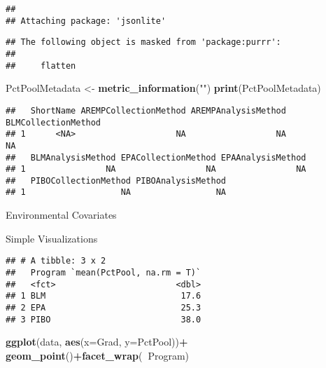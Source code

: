 \documentclass[]{article}
\newenvironment{Shaded}{\begin{snugshade}}{\end{snugshade}}
\newcommand{\DataTypeTok}[1]{\textcolor[rgb]{0.13,0.29,0.53}{#1}}
\newcommand{\KeywordTok}[1]{\textcolor[rgb]{0.13,0.29,0.53}{\textbf{#1}}}
\newcommand{\NormalTok}[1]{#1}
\newcommand{\OperatorTok}[1]{\textcolor[rgb]{0.81,0.36,0.00}{\textbf{#1}}}
\newcommand{\StringTok}[1]{\textcolor[rgb]{0.31,0.60,0.02}{#1}}
\begin{document}
\begin{verbatim}
## 
## Attaching package: 'jsonlite'
\end{verbatim}

\begin{verbatim}
## The following object is masked from 'package:purrr':
## 
##     flatten
\end{verbatim}

\begin{Shaded}
\begin{Highlighting}[]
\NormalTok{PctPoolMetadata <-}\StringTok{ }\KeywordTok{metric_information}\NormalTok{(}\StringTok{""}\NormalTok{)}
\KeywordTok{print}\NormalTok{(PctPoolMetadata)}
\end{Highlighting}
\end{Shaded}

\begin{verbatim}
##   ShortName AREMPCollectionMethod AREMPAnalysisMethod BLMCollectionMethod
## 1      <NA>                    NA                  NA                  NA
##   BLMAnalysisMethod EPACollectionMethod EPAAnalysisMethod
## 1                NA                  NA                NA
##   PIBOCollectionMethod PIBOAnalysisMethod
## 1                   NA                 NA
\end{verbatim}

Environmental Covariates

Simple Visualizations

\begin{Shaded}
\end{Shaded}

\begin{verbatim}
## # A tibble: 3 x 2
##   Program `mean(PctPool, na.rm = T)`
##   <fct>                        <dbl>
## 1 BLM                           17.6
## 2 EPA                           25.3
## 3 PIBO                          38.0
\end{verbatim}

\begin{Shaded}
\begin{Highlighting}[]
\KeywordTok{ggplot}\NormalTok{(data, }\KeywordTok{aes}\NormalTok{(}\DataTypeTok{x=}\NormalTok{Grad, }\DataTypeTok{y=}\NormalTok{PctPool))}\OperatorTok{+}\StringTok{ }\KeywordTok{geom_point}\NormalTok{()}\OperatorTok{+}\KeywordTok{facet_wrap}\NormalTok{(}\OperatorTok{~}\NormalTok{Program)}
\end{Highlighting}
\end{Shaded}
\end{document}
